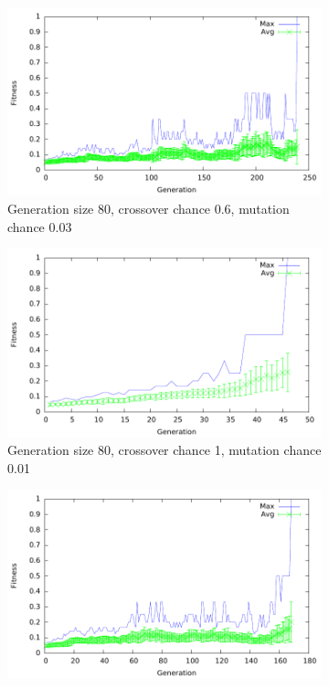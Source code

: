 \begin{figure}[H]
        \centering
        \begin{subfigure}[b]{0.5\textwidth}
                \includegraphics[width=\textwidth]{../results/omx-fgr-fp/omx-80-06-003.pdf}
                \caption{Generation size 80, crossover chance 0.6, mutation chance 0.03}
                \label{fig:gull}
        \end{subfigure}%
        \begin{subfigure}[b]{0.5\textwidth}
                \includegraphics[width=\textwidth]{../results/omx-fgr-fp/omx-80-1-001.pdf}
                \caption{Generation size 80, crossover chance 1, mutation chance 0.01}
                \label{fig:tiger}
        \end{subfigure}
        \begin{subfigure}[b]{0.5\textwidth}
                \includegraphics[width=\textwidth]{../results/omx-fgr-fp/omx-80-1-003.pdf}

\end{subfigure}
\end{figure}

